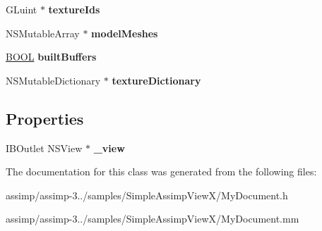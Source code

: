 \begin{DoxyCompactItemize}
\item 
\hypertarget{interface_my_document_a1efe0920bd07507620a2c5afc48af67a}{G\+Luint $\ast$ {\bfseries texture\+Ids}}\label{interface_my_document_a1efe0920bd07507620a2c5afc48af67a}

\item 
\hypertarget{interface_my_document_afe1af3274077917f27fb0ab66c635a38}{N\+S\+Mutable\+Array $\ast$ {\bfseries model\+Meshes}}\label{interface_my_document_afe1af3274077917f27fb0ab66c635a38}

\item 
\hypertarget{interface_my_document_aa52fd357a33f60ef850d889e864f8c0e}{\hyperlink{_ice_types_8h_a050c65e107f0c828f856a231f4b4e788}{B\+O\+O\+L} {\bfseries built\+Buffers}}\label{interface_my_document_aa52fd357a33f60ef850d889e864f8c0e}

\item 
\hypertarget{interface_my_document_ac0f4abb65cf3696a5c4a24af090b9d14}{N\+S\+Mutable\+Dictionary $\ast$ {\bfseries texture\+Dictionary}}\label{interface_my_document_ac0f4abb65cf3696a5c4a24af090b9d14}

\end{DoxyCompactItemize}
\subsection*{Properties}
\begin{DoxyCompactItemize}
\item 
\hypertarget{interface_my_document_a53ba83375e6a5f15dc1f4f77303fcf9f}{I\+B\+Outlet N\+S\+View $\ast$ {\bfseries \+\_\+view}}\label{interface_my_document_a53ba83375e6a5f15dc1f4f77303fcf9f}

\end{DoxyCompactItemize}


The documentation for this class was generated from the following files\+:\begin{DoxyCompactItemize}
\item 
assimp/assimp-\/3../samples/\+Simple\+Assimp\+View\+X/My\+Document.\+h\item 
assimp/assimp-\/3../samples/\+Simple\+Assimp\+View\+X/My\+Document.\+mm\end{DoxyCompactItemize}
